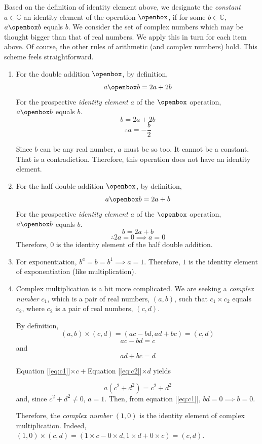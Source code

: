 \documentclass[english,notitlepage,smartquotes]{hgbreport}
\theoremstyle{definition}
\theoremstyle{definition}
\theoremstyle{remark}
\theoremstyle{definition}
\theoremstyle{plain}
\theoremstyle{definition}
\begin{document}
Based on the definition of identity element above, we designate the \emph{constant} $a\in\mathbb{C}$ an identity element of the operation $\openbox$, if for some $b\in\mathbb{C}$, $a\openbox b$ equals $b$. We consider the set of complex numbers which may be thought bigger than that of real numbers. We apply this in turn for each item above. Of course, the other rules of arithmetic (and complex numbers) hold. This scheme feels straightforward.
\begin{enumerate}
\item For the double addition $\openbox$, by definition,
$$
a\openbox b=2a+2b
$$
For the prospective \emph{identity element} $a$ of the $\openbox$ operation, $a\openbox b$ equals $b$.
$$
b=2a+2b
$$
$$
\therefore a=-\frac{b}{2}
$$

Since $b$ can be any real number, $a$ must be so too. It cannot be a constant. That is a contradiction. Therefore, this operation does not have an identity element.
\item For the half double addition $\openbox$, by definition,
$$
a\openbox b=2a+b
$$
For the prospective \emph{identity element} $a$ of the $\openbox$ operation, $a\openbox b$ equals $b$.
$$
b=2a+b
$$
$$
\therefore 2a=0\implies a=0
$$
Therefore, $0$ is the identity element of the half double addition. 
\item For exponentiation, $b^a=b=b^1\implies a=1$. Therefore, $1$ is the identity element of exponentiation (like multiplication).
\item Complex multiplication is a bit more complicated. We are seeking a \emph{complex number} $c_1$, which is a pair of real numbers, $(a,b)$, such that $c_1\times c_2$ equals $c_2$, where $c_2$ is a pair of real numbers, $(c,d)$.

By definition,
$$
(a,b)\times(c,d)=(ac-bd,ad+bc)=(c,d)
$$
\begin{equation}
\label{eq:c1}
ac-bd=c
\end{equation}
and
\begin{equation}
\label{eq:c2}
ad+bc=d
\end{equation}

Equation [\ref{eq:c1}]$\times c+$Equation [\ref{eq:c2}]$\times d$ yields

$$
a(c^2+d^2)=c^2+d^2
$$
and, since $c^2+d^2\ne 0$, $a=1$. Then, from equation [\ref{eq:c1}], $bd=0\implies b=0$.

Therefore, the \emph{complex number} $(1,0)$ is the identity element of complex multiplication. Indeed, $(1,0)\times(c,d)=(1\times c-0\times d,1\times d+0\times c)=(c,d)$.


\end{enumerate}
\end{document}
